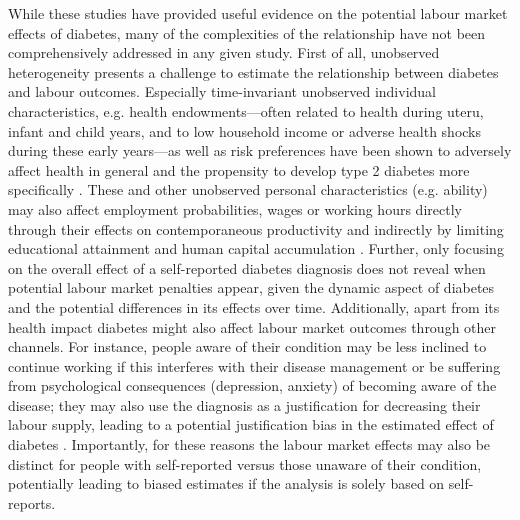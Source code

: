 While these studies have provided useful evidence on the potential labour market effects of diabetes, many of the complexities of the relationship have not been comprehensively addressed in any given study. First of all, unobserved heterogeneity presents a challenge to estimate the relationship between diabetes and labour outcomes. Especially time-invariant unobserved individual characteristics, e.g. health endowments---often related to health during uteru, infant and child years, and to low household income or adverse health shocks during these early years---as well as risk preferences have been shown to adversely affect health in general and the propensity to develop type 2 diabetes more specifically \parencite{VanEwijk2011,Sotomayor2013,Li2010b}. These and other unobserved personal characteristics (e.g. ability) may also affect employment probabilities, wages or working hours directly through their effects on contemporaneous productivity \parencite{Currie2013} and indirectly by limiting educational attainment and human capital accumulation \parencite{Ayyagari2011a}. Further, only focusing on the overall effect of a self-reported diabetes diagnosis does not reveal when potential labour market penalties appear, given the dynamic aspect of diabetes and the potential differences in its effects over time. Additionally, apart from its health impact diabetes might also affect labour market outcomes through other channels. For instance, people aware of their condition may be less inclined to continue working if this interferes with their disease management or be suffering from psychological consequences (depression, anxiety) of becoming aware of the disease; they may also use the diagnosis as a justification for decreasing their labour supply, leading to a potential justification bias in the estimated effect of diabetes \parencite{Kapteyn2009}. Importantly, for these reasons the labour market effects may also be distinct for people with self-reported versus those unaware of their condition, potentially leading to biased estimates if the analysis is solely based on self-reports.

